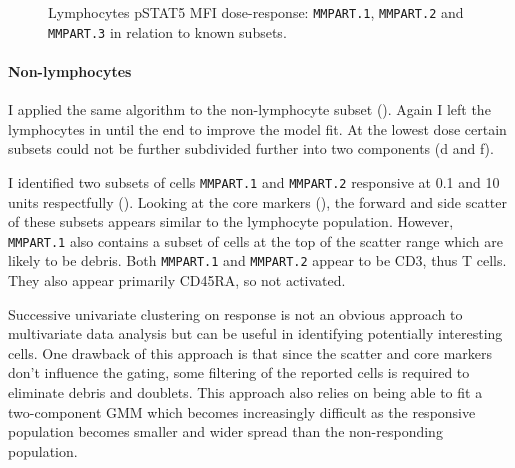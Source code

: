 \begin{figure}
\begin{minipage}{.5\textwidth}
\end{minipage}
\begin{minipage}{.3\textwidth}
{ Lymphocytes pSTAT5 MFI dose-response: \texttt{MMPART.1}, \texttt{MMPART.2} and \texttt{MMPART.3} in relation to known subsets. }
{ }
\end{minipage}
\end{figure}

\clearpage


\paragraph{Non-lymphocytes}

I applied the same algorithm to the non-lymphocyte subset ().
Again I left the lymphocytes in until the end to improve the model fit.
At the lowest dose certain subsets could not be further subdivided further into two components (d and f).

I identified two subsets of cells \texttt{MMPART.1} and \texttt{MMPART.2} responsive at 0.1 and 10 units respectfully ().
Looking at the core markers (), the forward and side scatter of these subsets appears similar to the lymphocyte population.
However, \texttt{MMPART.1} also contains a subset of cells at the top of the scatter range which are likely to be debris.
Both \texttt{MMPART.1} and \texttt{MMPART.2} appear to be CD3\positive, thus T cells.
They also appear primarily CD45RA\negative, so not activated.

Successive univariate clustering on response is not an obvious approach to multivariate data analysis but can be useful in identifying potentially interesting cells.
One drawback of this approach is that since the scatter and core markers don't influence the gating, some filtering of the reported cells is required to eliminate
debris and doublets.
This approach also relies on being able to fit a two-component \gls{GMM} which becomes increasingly difficult as the responsive population becomes smaller and wider
spread than the non-responding population.

